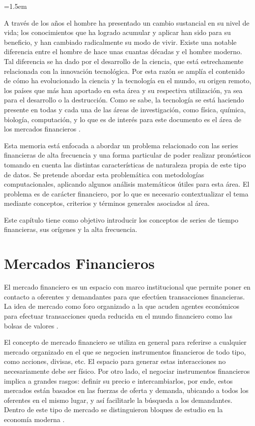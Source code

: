 \parindent=1.5em

A través de los años el hombre ha presentado un cambio sustancial en su nivel de vida; los conocimientos que ha logrado acumular y aplicar han sido para su beneficio,
y han cambiado radicalmente su modo de vivir. Existe una notable diferencia entre el hombre de hace unas cuantas décadas y el hombre moderno. Tal diferencia se ha
dado por el desarrollo de la ciencia, que está estrechamente relacionada con la innovación tecnológica. Por esta razón se amplía el contenido de cómo ha
evolucionado la ciencia y la tecnología en el mundo, su origen remoto, los países que más han aportado en esta área y su respectiva utilización, ya sea para
el desarrollo o la destrucción. Como se sabe, la tecnología se está haciendo presente en todas y cada una de las áreas de investigación, como física, química, 
biología, computación, y lo que es de interés para este documento es el área de los mercados financieros \cite{watsham1997quantitative}.

Esta memoria está enfocada a abordar un problema relacionado con las series financieras de alta frecuencia y una forma particular de poder realizar pronósticos tomando 
en cuenta las distintas características de naturaleza propia de este tipo de datos. Se pretende abordar esta problemática con metodologías computacionales, 
aplicando algunos análisis matemáticos útiles para esta área. El problema es de carácter financiero, por lo que es necesario contextualizar el tema mediante 
conceptos, criterios y términos generales asociados al área.

Este capítulo tiene como objetivo introducir los conceptos de series de tiempo financieras, sus orígenes y la alta frecuencia.

\section{Mercados Financieros}

El mercado financiero es un espacio con marco institucional que permite poner en contacto a oferentes y demandantes para que efectúen
transacciones financieras. La idea de mercado como foro organizado a la que acuden agentes económicos para efectuar transacciones
queda reducida en el mundo financiero como las bolsas de valores \cite{mishkin2006financial}.

El concepto de mercado financiero se utiliza en general para referirse a cualquier mercado organizado en el que se negocien instrumentos financieros
de todo tipo, como acciones, divisas, etc. El espacio para generar estas interacciones no necesariamente debe ser físico. Por otro lado, el negociar
instrumentos financieros implica a grandes rasgos: definir su precio e intercambiarlos, por ende, estos mercados están basados en
las fuerzas de oferta y demanda, ubicando a todos los oferentes en el mismo lugar, y así facilitarle la búsqueda a los demandantes. Dentro
de este tipo de mercado se distinguieron bloques de estudio en la economía moderna \cite{jensen1984theory}.

